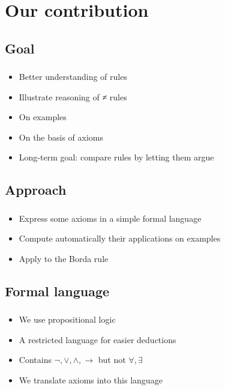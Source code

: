 \documentclass[french,english]{beamer}
\begin{document}
\section{Our contribution}
\subsection{Goal}
\begin{frame}
	\frametitle{\subsecname}
	\begin{itemize}
		\item Better understanding of rules
		\item Illustrate reasoning of ≠ rules
		\item On examples
		\item On the basis of axioms
		\item Long-term goal: compare rules by letting them argue
	\end{itemize}
\end{frame}

\subsection{Approach}
\begin{frame}
	\frametitle{\subsecname}
	\begin{itemize}
		\item Express some axioms in a simple formal language
		\item Compute automatically their applications on examples
		\item Apply to the Borda rule
	\end{itemize}
\end{frame}

\subsection{Formal language}
\begin{frame}
	\frametitle{\subsecname}
	\begin{itemize}
		\item We use propositional logic
		\item A restricted language for easier deductions
		\item Contains $¬, ∨,∧, →$ but not $\forall, \exists$
		\item We translate axioms into this language
	\end{itemize}
\end{frame}
\end{document}
